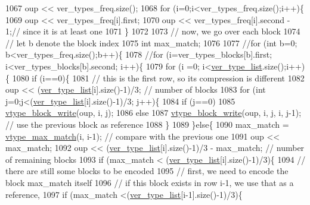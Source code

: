 \begin{DoxyCode}
1067   oup << ver\_types\_freq.size();
1068   \textcolor{keywordflow}{for} (i=0;i<ver\_types\_freq.size();i++)\{
1069     oup << ver\_types\_freq[i].first;
1070     oup << ver\_types\_freq[i].second - 1;\textcolor{comment}{// since it is at least one}
1071   \}
1072 
1073   \textcolor{comment}{// now, we go over each block}
1074   \textcolor{comment}{// let b denote the block index}
1075   \textcolor{keywordtype}{int} max\_match;
1076 
1077   \textcolor{comment}{//for (int b=0; b<ver\_types\_freq.size();b++)\{}
1078   \textcolor{comment}{//for (i=ver\_types\_blocks[b].first; i<ver\_types\_blocks[b].second; i++)\{}
1079   \textcolor{keywordflow}{for} (i =0; i<\hyperlink{classmarked__graph__compressed_af2e3e55223d436628a02758dfae88493}{ver\_type\_list}.size();i++)\{
1080     \textcolor{keywordflow}{if} (i==0)\{
1081       \textcolor{comment}{// this is the first row, so its compression is different}
1082       oup << (\hyperlink{classmarked__graph__compressed_af2e3e55223d436628a02758dfae88493}{ver\_type\_list}[i].size()-1)/3; \textcolor{comment}{// number of blocks}
1083       \textcolor{keywordflow}{for} (\textcolor{keywordtype}{int} j=0;j<(\hyperlink{classmarked__graph__compressed_af2e3e55223d436628a02758dfae88493}{ver\_type\_list}[i].size()-1)/3; j++)\{
1084         \textcolor{keywordflow}{if} (j==0)
1085           \hyperlink{classmarked__graph__compressed_a31f9ea72682f9072d0f90faf58a603fe}{vtype\_block\_write}(oup, i, j);
1086         \textcolor{keywordflow}{else}
1087           \hyperlink{classmarked__graph__compressed_a31f9ea72682f9072d0f90faf58a603fe}{vtype\_block\_write}(oup, i, j, i, j-1); \textcolor{comment}{// use the previous block as reference}
1088       \}
1089     \}\textcolor{keywordflow}{else}\{
1090       max\_match = \hyperlink{classmarked__graph__compressed_a5ce51414e335d817f4be781fdcfbe9b1}{vtype\_max\_match}(i, i-1); \textcolor{comment}{// compare with the previous one}
1091       oup << max\_match;
1092       oup << (\hyperlink{classmarked__graph__compressed_af2e3e55223d436628a02758dfae88493}{ver\_type\_list}[i].size()-1)/3 - max\_match; \textcolor{comment}{// number of remaining blocks}
1093       \textcolor{keywordflow}{if} (max\_match < (\hyperlink{classmarked__graph__compressed_af2e3e55223d436628a02758dfae88493}{ver\_type\_list}[i].size()-1)/3)\{
1094         \textcolor{comment}{// there are still some blocks to be encoded}
1095         \textcolor{comment}{// first, we need to encode the block max\_match itself}
1096         \textcolor{comment}{// if this block exists in row i-1, we use that as a reference,}
1097         \textcolor{keywordflow}{if} (max\_match <(\hyperlink{classmarked__graph__compressed_af2e3e55223d436628a02758dfae88493}{ver\_type\_list}[i-1].size()-1)/3)\{

\end{DoxyCode}
